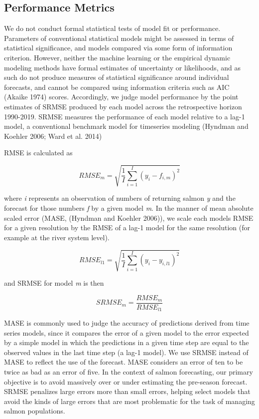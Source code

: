 \documentclass[
]{article}
\begin{document}
\hypertarget{performance-metrics}{%
\subsection*{Performance Metrics}\label{performance-metrics}}

We do not conduct formal statistical tests of model fit or performance. Parameters of conventional statistical models might be assessed in terms of statistical significance, and models compared via some form of information criterion. However, neither the machine learning or the empirical dynamic modeling methods have formal estimates of uncertainty or likelihoods, and as such do not produce measures of statistical significance around individual forecasts, and cannot be compared using information criteria such as AIC (Akaike 1974) scores. Accordingly, we judge model performance by the point estimates of SRMSE produced by each model across the retrospective horizon 1990-2019. SRMSE measures the performance of each model relative to a lag-1 model, a conventional benchmark model for timeseries modeling (Hyndman and Koehler 2006; Ward et al. 2014)

RMSE is calculated as

\[RMSE_m = \sqrt{\frac{1}{I}\sum\limits_{i = 1}^I(y_{i} - f_{i,m})^2}\]

where \emph{i} represents an observation of numbers of returning salmon \emph{y} and the forecast for those numbers \emph{f} by a given model \emph{m}. In the manner of mean absolute scaled error (MASE, (Hyndman and Koehler 2006)), we scale each models RMSE for a given resolution by the RMSE of a lag-1 model for the same resolution (for example at the river system level).

\[RMSE_{l1} = \sqrt{\frac{1}{I}\sum\limits_{i = 1}^I(y_{i} - y_{i,l1})^2}\]

and SRMSE for model \emph{m} is then

\[SRMSE_m = \frac{RMSE_m}{RMSE_{l1}}\]

MASE is commonly used to judge the accuracy of predictions derived from time series models, since it compares the error of a given model to the error expected by a simple model in which the predictions in a given time step are equal to the observed values in the last time step (a lag-1 model). We use SRMSE instead of MASE to reflect the use of the forecast. MASE considers an error of ten to be twice as bad as an error of five. In the context of salmon forecasting, our primary objective is to avoid massively over or under estimating the pre-season forecast. SRMSE penalizes large errors more than small errors, helping select models that avoid the kinds of large errors that are most problematic for the task of managing salmon populations.
\end{document}
